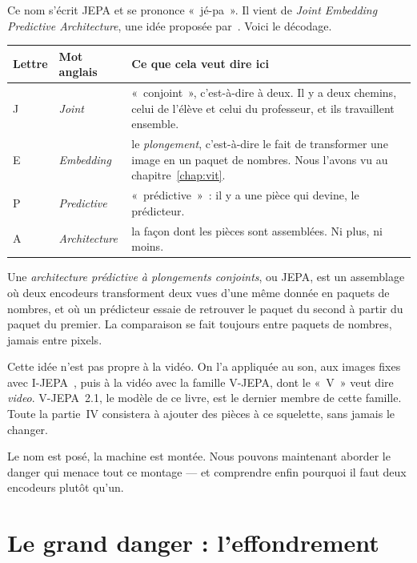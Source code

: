 Ce nom s'écrit JEPA et se prononce «~jé-pa~». Il vient de \emph{Joint
Embedding Predictive Architecture}, une idée proposée
par~\textcite{lecun2022path}. Voici le décodage.

\begin{center}
\footnotesize
\begin{tabular}{llp{6.6cm}}
\toprule
\textbf{Lettre} & \textbf{Mot anglais} & \textbf{Ce que cela veut dire ici} \\
\midrule
J & \emph{Joint} &
«~conjoint~», c'est-à-dire à deux. Il y a deux chemins, celui de l'élève et
celui du professeur, et ils travaillent ensemble. \\[2pt]
E & \emph{Embedding} &
le \emph{plongement}, c'est-à-dire le fait de transformer une image en un
paquet de nombres. Nous l'avons vu au chapitre~\ref{chap:vit}. \\[2pt]
P & \emph{Predictive} &
«~prédictive~»~: il y a une pièce qui devine, le prédicteur. \\[2pt]
A & \emph{Architecture} &
la façon dont les pièces sont assemblées. Ni plus, ni moins. \\
\bottomrule
\end{tabular}
\end{center}

\begin{definition}[JEPA][jepa]
Une \emph{architecture prédictive à plongements conjoints}, ou JEPA, est un
assemblage où deux encodeurs transforment deux vues d'une même donnée en
paquets de nombres, et où un prédicteur essaie de retrouver le paquet du
second à partir du paquet du premier. La comparaison se fait toujours entre
paquets de nombres, jamais entre pixels.
\end{definition}

\begin{enia}
Cette idée n'est pas propre à la vidéo. On l'a appliquée au son, aux images
fixes avec I-JEPA~\parencite{assran2023ijepa}, puis à la vidéo avec la
famille V-JEPA, dont le «~V~» veut dire \emph{video}. V-JEPA~2.1, le modèle
de ce livre, est le dernier membre de cette famille. Toute la partie~IV
consistera à ajouter des pièces à ce squelette, sans jamais le changer.
\end{enia}

Le nom est posé, la machine est montée. Nous pouvons maintenant aborder le
danger qui menace tout ce montage — et comprendre enfin pourquoi il faut
deux encodeurs plutôt qu'un.

\section{Le grand danger : l'effondrement}
\label{sec:effondrement}

